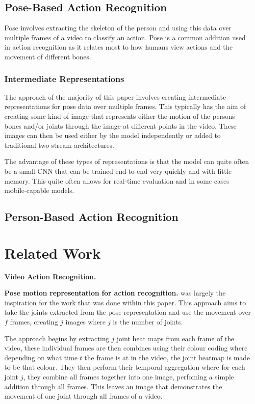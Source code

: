 \documentclass[10pt,twocolumn,letterpaper]{article}
\begin{document}
\subsection{Pose-Based Action Recognition}

Pose involves extracting the skeleton of the person and using this data over multiple frames of a video to classify an action. Pose is a common addition used in action recognition as it relates most to how humans view actions and the movement of different bones.

\subsubsection{Intermediate Representations}

The approach of the majority of this paper involves creating intermediate representations for pose data over multiple frames. This typically has the aim of creating some kind of image that represents either the motion of the persons bones and/or joints through the image at different points in the video. These images can then be used either by the model independently or added to traditional two-stream architectures.

The advantage of these types of representations is that the model can quite often be a small CNN that can be trained end-to-end very quickly and with little memory. This quite often allows for real-time evaluation and in some cases mobile-capable models.

\subsection{Person-Based Action Recognition}

\section{Related Work}
\label{sec:relatedwork}

\textbf{Video Action Recognition.} 

\textbf{Pose motion representation for action recognition.} \cite{potion} was largely the inspiration for the work that was done within this paper. This approach aims to take the joints extracted from the pose representation and use the movement over $f$ frames, creating $j$ images where $j$ is the number of joints.

The approach begins by extracting $j$ joint heat maps from each frame of the video, these individual frames are then combines using their colour coding where depending on what time $t$ the frame is at in the video, the joint heatmap is made to be that colour. They then perform their temporal aggregation where for each joint $j$, they combine all frames together into one image, perfoming a simple addition through all frames. This leaves an image that demonstrates the movement of one joint through all frames of a video.
\end{document}

